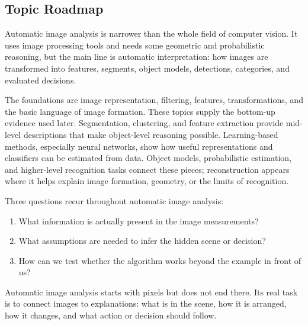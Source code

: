 \subsection{Topic Roadmap}

Automatic image analysis is narrower than the whole field of computer vision.
It uses image processing tools and needs some geometric and probabilistic
reasoning, but the main line is automatic interpretation: how images are
transformed into features, segments, object models, detections, categories, and
evaluated decisions.

The foundations are image representation, filtering, features, transformations,
and the basic language of image formation. These topics supply the bottom-up
evidence used later. Segmentation, clustering, and feature extraction provide
mid-level descriptions that make object-level reasoning possible. Learning-based
methods, especially neural networks, show how useful representations and
classifiers can be estimated from data. Object models, probabilistic estimation,
and higher-level recognition tasks connect these pieces; reconstruction appears
where it helps explain image formation, geometry, or the limits of recognition.

Three questions recur throughout automatic image analysis:

\begin{enumerate}
  \item What information is actually present in the image measurements?
  \item What assumptions are needed to infer the hidden scene or decision?
  \item How can we test whether the algorithm works beyond the example in front
        of us?
\end{enumerate}

\noindent
Automatic image analysis starts with pixels but does not end there. Its real
task is to connect images to explanations: what is in the scene, how it is
arranged, how it changes, and what action or decision should follow.
